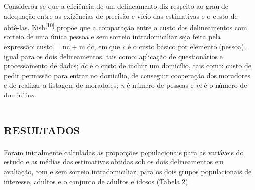 \documentclass{article}
\begin{document}
Considerou-se que a eficiência de um delineamento diz respeito ao grau de
adequação entre as exigências de precisão e vício das estimativas e o custo de
obtê-las. Kish\textsuperscript{[}\textsuperscript{10}\textsuperscript{]}
propõe que a comparação entre o custo dos delineamentos com sorteio de uma única
pessoa e sem sorteio intradomiciliar seja feita pela expressão: custo = nc +
m.dc, em que \textit{c}
é o custo básico por elemento (pessoa), igual para os dois delineamentos, tais
como: aplicação de questionários e processamento de dados; \textit{dc}
é o custo de incluir um domicílio, tais como: custo de pedir permissão para
entrar no domicílio, de conseguir cooperação dos moradores e de realizar a
listagem de moradores; \textit{n}
é número de pessoas e \textit{m}
é o número de domicílios.

\section{\textsc{resultados}}

Foram inicialmente calculadas as proporções populacionais para as variáveis do
estudo e as médias das estimativas obtidas sob os dois delineamentos em
avaliação, com e sem sorteio intradomiciliar, para os dois grupos populacionais
de interesse, adultos e o conjunto de adultos e idosos (Tabela 2).
\end{document}
